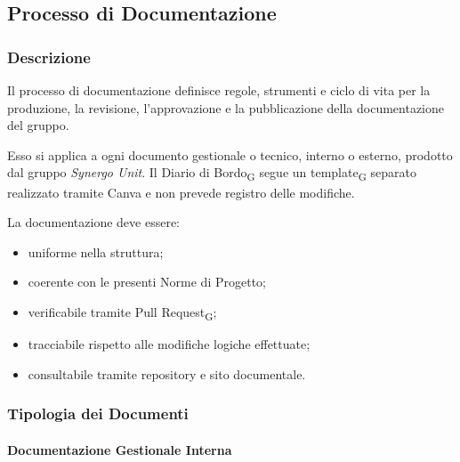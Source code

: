 \subsection{Processo di Documentazione}
\label{sec:documentazione}

\subsubsection{Descrizione}

Il processo di documentazione definisce regole, strumenti e ciclo di vita per la
produzione, la revisione, l'approvazione e la pubblicazione della documentazione
del gruppo.

Esso si applica a ogni documento gestionale o tecnico, interno o esterno, prodotto
dal gruppo \textit{Synergo Unit}. Il Diario di Bordo\textsubscript{G} segue un template\textsubscript{G} separato
realizzato tramite Canva e non prevede registro delle modifiche.

La documentazione deve essere:
\begin{itemize}
    \item uniforme nella struttura;
    \item coerente con le presenti Norme di Progetto;
    \item verificabile tramite Pull Request\textsubscript{G};
    \item tracciabile rispetto alle modifiche logiche effettuate;
    \item consultabile tramite repository e sito documentale.
\end{itemize}


\subsubsection{Tipologia dei Documenti}

\paragraph{Documentazione Gestionale Interna}

